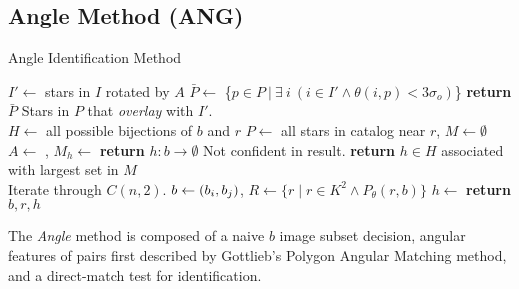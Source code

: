 \documentclass[conference]{IEEEtran}
\begin{document}
    \subsection{Angle Method (ANG)}\label{subsec:angleMethod}
    \newcommand{\invalidBijection}{\If{$\forall \ \vv{b^\star}, \ \vv{b^\star} \in b \land h\left(\vv{b^\star}\right)
    \neq \emptyset$}}
    \begin{algorithm}
        \caption{Angle Identification Method} \label{algorithm:angleIdentification}
        \begin{algorithmic}[1]
            \State $I' \gets$ stars in $I$ rotated by $A$
            \State $\bar{P} \gets $ \{$p \in P \ | \ \exists \ i \ (i \in I' \land \theta (i, p) < 3\sigma_o)$\}
            \State \textbf{return} $\bar{P}$ \Comment Stars in $P$ that \textit{overlay} with $I'$.
            \EndFunction
            \\
            \State $H \gets $ all possible bijections of $b$ and $r$
            \State $P \gets $ all stars in catalog near $r$, $M \gets \emptyset$
            \State $A \gets $ , $M_h \gets $ 
            \EndFor
            \State \textbf{return} $h : b \rightarrow \emptyset $ \Comment Not confident in result.
            \Else
            \State \textbf{return} $h \in H$ associated with largest set in $M$
            \EndIf
            \EndFunction
            \\
             \Comment Iterate through $C(n, 2)$.
            \State $b \gets \left(b_i, b_j\right)$, $R \gets \{ r \mid r \in K^2 \land P_\theta(r, b) \}$
            \State $h \gets $  %
            \invalidBijection
            \State \textbf{return} $b, r, h$
            \EndIf
            \EndIf
            \EndFor
            \EndFor
            \EndFunction
        \end{algorithmic}
    \end{algorithm}

    The \textit{Angle} method is composed of a naive $b$ image subset decision, angular features of pairs first described by
    Gottlieb's Polygon Angular Matching method, and a direct-match test for identification.
\end{document}
